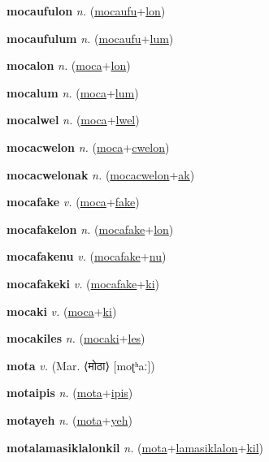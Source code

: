 \textbf{\hypertarget{mocaufulon}{mocaufulon}} \textit{n.} (\hyperlink{mocaufu}{mocaufu}+\allowbreak \hyperlink{lon}{lon})


\textbf{\hypertarget{mocaufulum}{mocaufulum}} \textit{n.} (\hyperlink{mocaufu}{mocaufu}+\allowbreak \hyperlink{lum}{lum})


\textbf{\hypertarget{mocalon}{mocalon}} \textit{n.} (\hyperlink{moca}{moca}+\allowbreak \hyperlink{lon}{lon})


\textbf{\hypertarget{mocalum}{mocalum}} \textit{n.} (\hyperlink{moca}{moca}+\allowbreak \hyperlink{lum}{lum})


\textbf{\hypertarget{mocalwel}{mocalwel}} \textit{n.} (\hyperlink{moca}{moca}+\allowbreak \hyperlink{lwel}{lwel})


\textbf{\hypertarget{mocacwelon}{mocacwelon}} \textit{n.} (\hyperlink{moca}{moca}+\allowbreak \hyperlink{cwelon}{cwelon})


\textbf{\hypertarget{mocacwelonak}{mocacwelonak}} \textit{n.} (\hyperlink{mocacwelon}{mocacwelon}+\allowbreak \hyperlink{ak}{ak})


\textbf{\hypertarget{mocafake}{mocafake}} \textit{v.} (\hyperlink{moca}{moca}+\allowbreak \hyperlink{fake}{fake})


\textbf{\hypertarget{mocafakelon}{mocafakelon}} \textit{n.} (\hyperlink{mocafake}{mocafake}+\allowbreak \hyperlink{lon}{lon})


\textbf{\hypertarget{mocafakenu}{mocafakenu}} \textit{v.} (\hyperlink{mocafake}{mocafake}+\allowbreak \hyperlink{nu}{nu})


\textbf{\hypertarget{mocafakeki}{mocafakeki}} \textit{v.} (\hyperlink{mocafake}{mocafake}+\allowbreak \hyperlink{ki}{ki})


\textbf{\hypertarget{mocaki}{mocaki}} \textit{v.} (\hyperlink{moca}{moca}+\allowbreak \hyperlink{ki}{ki})


\textbf{\hypertarget{mocakiles}{mocakiles}} \textit{n.} (\hyperlink{mocaki}{mocaki}+\allowbreak \hyperlink{les}{les})


\textbf{\hypertarget{mota}{mota}} \textit{v.} (Mar. ⟨{\devanagari{}मोठा}⟩ [moʈʰaː])


\textbf{\hypertarget{motaipis}{motaipis}} \textit{n.} (\hyperlink{mota}{mota}+\allowbreak \hyperlink{ipis}{ipis})


\textbf{\hypertarget{motayeh}{motayeh}} \textit{n.} (\hyperlink{mota}{mota}+\allowbreak \hyperlink{yeh}{yeh})


\textbf{\hypertarget{motalamasiklalonkil}{motalamasiklalonkil}} \textit{n.} (\hyperlink{mota}{mota}+\allowbreak \hyperlink{lamasiklalon}{lamasiklalon}+\allowbreak \hyperlink{kil}{kil})



